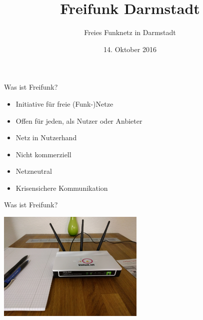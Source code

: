 \documentclass[t]{beamer}
\title{Freifunk Darmstadt}
\author{Freies Funknetz in Darmstadt} %
\date{14. Oktober 2016}
\begin{document}
  \maketitle
  
  \begin{frame}{Was ist Freifunk?}
    \begin{itemize}
      \item Initiative für freie (Funk-)Netze
      \item Offen für jeden, als Nutzer oder Anbieter
      \item Netz in Nutzerhand
      \item Nicht kommerziell
      \item Netzneutral
      \item Krisensichere Kommunikation
    \end{itemize}
  \end{frame}

  \begin{frame}{Was ist Freifunk?}
    \begin{center}
      \includegraphics[width=7cm]{images/homerouter}
    \end{center}
  \end{frame}
\end{document}
